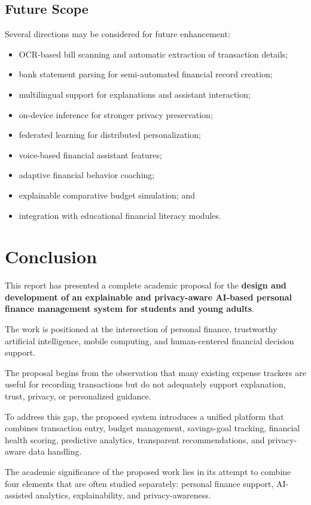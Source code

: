 \documentclass[12pt,a4paper]{report}
\begin{document}
\section{Future Scope}
Several directions may be considered for future enhancement:
\begin{itemize}[leftmargin=2em]
\item OCR-based bill scanning and automatic extraction of transaction details;
\item bank statement parsing for semi-automated financial record creation;
\item multilingual support for explanations and assistant interaction;
\item on-device inference for stronger privacy preservation;
\item federated learning for distributed personalization;
\item voice-based financial assistant features;
\item adaptive financial behavior coaching;
\item explainable comparative budget simulation;
and
\item integration with educational financial literacy modules.
\end{itemize}

\chapter*{Conclusion}
This report has presented a complete academic proposal for the
\textbf{design and development of an explainable and privacy-aware AI-based personal finance management system for students and young adults}.

The work is positioned at the intersection of personal finance,
trustworthy artificial intelligence,
mobile computing,
and human-centered financial decision support.

The proposal begins from the observation that many existing expense trackers are useful for recording transactions but do not adequately support explanation,
trust,
privacy,
or personalized guidance.

To address this gap,
the proposed system introduces a unified platform that combines transaction entry,
budget management,
savings-goal tracking,
financial health scoring,
predictive analytics,
transparent recommendations,
and privacy-aware data handling.

The academic significance of the proposed work lies in its attempt to combine four elements that are often studied separately:
personal finance support,
AI-assisted analytics,
explainability,
and privacy-awareness.
\end{document}
